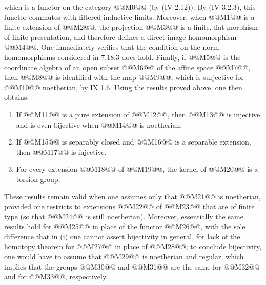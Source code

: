 which is a functor on the category @@M0@@ (by (IV 2.12)). By (IV 3.2.3), this functor commutes with filtered inductive limits. Moreover, when @@M1@@ is a finite extension of @@M2@@, the projection @@M3@@ is a finite, flat morphism of finite presentation, and therefore defines a direct-image homomorphism @@M4@@. One immediately verifies that the condition on the norm homomorphisms considered in 7.18.3 does hold. Finally, if @@M5@@ is the coordinate algebra of an open subset @@M6@@ of the affine space @@M7@@, then @@M8@@ is identified with the map @@M9@@, which is surjective for @@M10@@ noetherian, by IX 1.6. Using the results proved above, one then obtains:
\begin{enumerate}[label=(\roman*)]
\item If @@M11@@ is a pure extension of @@M12@@, then @@M13@@ is injective, and is even bijective when @@M14@@ is noetherian.
\item If @@M15@@ is separably closed and @@M16@@ is a separable extension, then @@M17@@ is injective.
\item For every extension @@M18@@ of @@M19@@, the kernel of @@M20@@ is a torsion group.
\end{enumerate}
These results remain valid when one assumes only that @@M21@@ is noetherian, provided one restricts to extensions @@M22@@ of @@M23@@ that are of finite type (so that @@M24@@ is still noetherian). Moreover, essentially the same results hold for @@M25@@ in place of the functor @@M26@@, with the sole difference that in (i) one cannot assert bijectivity in general, for lack of the homotopy theorem for @@M27@@ in place of @@M28@@; to conclude bijectivity, one would have to assume that @@M29@@ is noetherian and regular, which implies that the groups @@M30@@ and @@M31@@ are the same for @@M32@@ and for @@M33@@, respectively.

